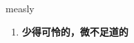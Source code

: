 
\begin{frame}
{\huge measly}
\begin{center}
\begin{enumerate}\Large
  \item \textbf{少得可怜的，微不足道的}
\end{enumerate}
\end{center}
\end{frame}
